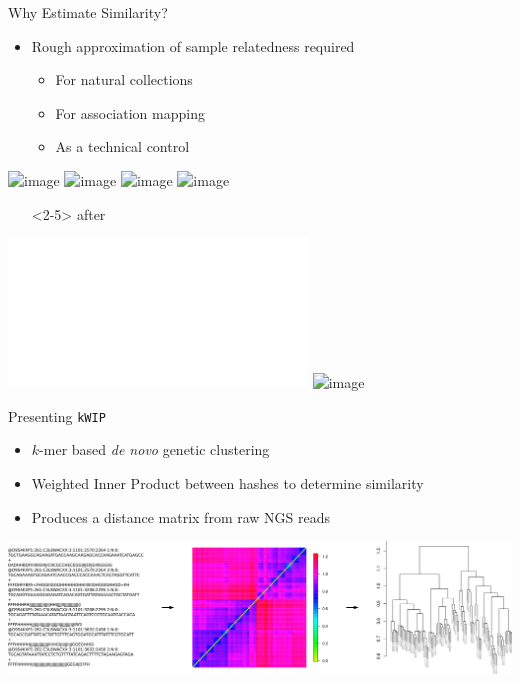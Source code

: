\documentclass[t]{beamer}
\begin{document}
\begin{frame}{Why Estimate Similarity?}
  \begin{itemize}
    \item Rough approximation of sample relatedness required
      \begin{itemize}
        \item For natural collections
        \item For association mapping
        \item As a technical control
      \end{itemize}
  \end{itemize}
  \pause
  \begin{center}
    \includegraphics<2>[width=\textwidth]{img/restruct-1}
    \includegraphics<3>[width=\textwidth]{img/restruct-2}
    \includegraphics<4>[width=\textwidth]{img/restruct-3}
    \includegraphics<5>[width=\textwidth]{img/restruct-4}
    \begin{itemize}
      \item[]<2-5> \tiny{after \textcite{brachi_genome-wide_2011}}
    \end{itemize}
    \includegraphics<6>[width=\textwidth]{img/jared-tree.pdf}
    \includegraphics<7>[width=0.6\textwidth]{img/at80-tree.png}
  \end{center}
\end{frame}


\begin{frame}{Presenting \texttt{kWIP}}
  \begin{itemize}
    \item $k$-mer based \textit{de novo} genetic clustering
    \item Weighted Inner Product between hashes to determine similarity
    \item Produces a distance matrix from raw NGS reads
  \end{itemize}
  \begin{center}
    \includegraphics[width=\textwidth]{img/kwip-overview.png}
  \end{center}
\end{frame}
\end{document}
